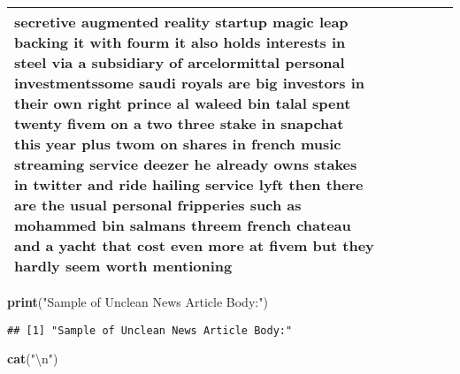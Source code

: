 \documentclass[]{article}
\newenvironment{Shaded}{\begin{snugshade}}{\end{snugshade}}
\newcommand{\KeywordTok}[1]{\textcolor[rgb]{0.13,0.29,0.53}{\textbf{#1}}}
\newcommand{\DecValTok}[1]{\textcolor[rgb]{0.00,0.00,0.81}{#1}}
\newcommand{\CharTok}[1]{\textcolor[rgb]{0.31,0.60,0.02}{#1}}
\newcommand{\StringTok}[1]{\textcolor[rgb]{0.31,0.60,0.02}{#1}}
\newcommand{\OperatorTok}[1]{\textcolor[rgb]{0.81,0.36,0.00}{\textbf{#1}}}
\newcommand{\NormalTok}[1]{#1}
\begin{document}
\begin{table}[!h]
\begin{tabular}[t]{llllll}
secretive augmented reality startup magic leap backing it with fourm it also holds interests in steel via a subsidiary of arcelormittal personal investmentssome saudi royals are big investors in their own right prince al waleed bin talal spent twenty fivem on a two three stake in snapchat this year plus twom on shares in french music streaming service deezer he already owns stakes in twitter and ride hailing service lyft then there are the usual personal fripperies such as mohammed bin salmans threem french chateau and a yacht that cost even more at fivem but they hardly seem worth mentioning\\
\bottomrule
\end{tabular}
\end{table}


\begin{Shaded}
\begin{Highlighting}[]
\KeywordTok{print}\NormalTok{(}\StringTok{"Sample of Unclean News Article Body:"}\NormalTok{)}
\end{Highlighting}
\end{Shaded}

\begin{verbatim}
## [1] "Sample of Unclean News Article Body:"
\end{verbatim}

\begin{Shaded}
\begin{Highlighting}[]
\KeywordTok{cat}\NormalTok{(}\StringTok{"}\CharTok{\textbackslash{}n}\StringTok{"}\NormalTok{)}
\end{Highlighting}
\end{Shaded}

\begin{Shaded}
\end{Shaded}
\end{document}

